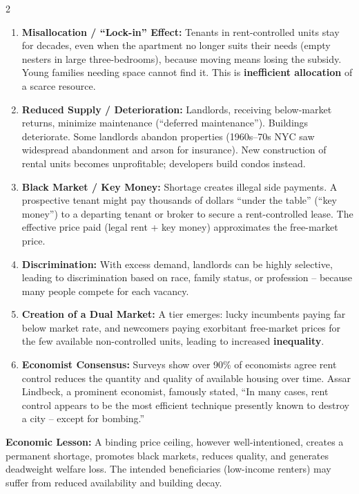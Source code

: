 \documentclass[10pt,a4paper]{article}
\begin{document}
\begin{multicols}{2}
\begin{enumerate}[leftmargin=*,nosep]
    \item \textbf{Misallocation / ``Lock-in'' Effect:} Tenants in rent-controlled units stay for decades, even when the apartment no longer suits their needs (empty nesters in large three-bedrooms), because moving means losing the subsidy. Young families needing space cannot find it. This is \textbf{inefficient allocation} of a scarce resource.
    \item \textbf{Reduced Supply / Deterioration:} Landlords, receiving below-market returns, minimize maintenance (``deferred maintenance''). Buildings deteriorate. Some landlords abandon properties (1960s--70s NYC saw widespread abandonment and arson for insurance). New construction of rental units becomes unprofitable; developers build condos instead.
    \item \textbf{Black Market / Key Money:} Shortage creates illegal side payments. A prospective tenant might pay thousands of dollars ``under the table'' (``key money'') to a departing tenant or broker to secure a rent-controlled lease. The effective price paid (legal rent + key money) approximates the free-market price.
    \item \textbf{Discrimination:} With excess demand, landlords can be highly selective, leading to discrimination based on race, family status, or profession -- because many people compete for each vacancy.
    \item \textbf{Creation of a Dual Market:} A tier emerges: lucky incumbents paying far below market rate, and newcomers paying exorbitant free-market prices for the few available non-controlled units, leading to increased \textbf{inequality}.
    \item \textbf{Economist Consensus:} Surveys show over 90\% of economists agree rent control reduces the quantity and quality of available housing over time. Assar Lindbeck, a prominent economist, famously stated, ``In many cases, rent control appears to be the most efficient technique presently known to destroy a city -- except for bombing.''
\end{enumerate}

\textbf{Economic Lesson:} A binding price ceiling, however well-intentioned, creates a permanent shortage, promotes black markets, reduces quality, and generates deadweight welfare loss. The intended beneficiaries (low-income renters) may suffer from reduced availability and building decay.


\end{multicols}
\end{document}
